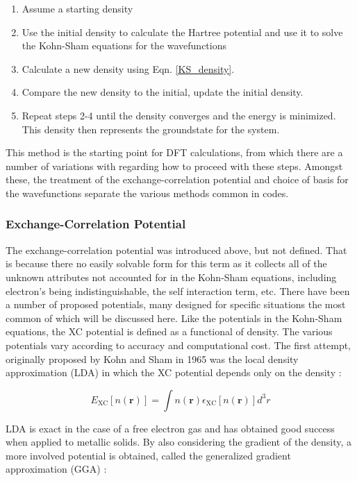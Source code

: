 \begin{enumerate}
	\item Assume a starting density
	\item Use the initial density to calculate the Hartree potential and use it to solve the Kohn-Sham equations for the wavefunctions
	\item Calculate a new density using Eqn. \ref{KS_density}.
	\item Compare the new density to the initial, update the initial density. 
	\item Repeat steps 2-4 until the density converges and the energy is minimized. This density then represents the groundstate for the system.
\end{enumerate}

This method is the starting point for DFT calculations, from which there are a number of  variations with regarding how to proceed with these steps.  Amongst these, the treatment of the exchange-correlation potential and choice of basis for the wavefunctions separate the various methods common in codes.  


\subsubsection{Exchange-Correlation Potential}
The exchange-correlation potential was introduced above, but not defined.  That is because there no easily solvable form for this term as it collects all of the unknown attributes not accounted for in the Kohn-Sham equations, including electron's being indistinguishable, the self interaction term, etc.   There have been a number of proposed potentials, many designed for specific situations the most common of which will be discussed here.  Like the potentials in the Kohn-Sham equations, the XC potential is defined as a functional of density.  The various potentials vary according to accuracy and computational cost.  The first attempt, originally proposed by Kohn and Sham in 1965 was the local density approximation (LDA) in which the XC potential depends only on the density \cite{tao_climbing_2003, ks_1965}: 

\begin{equation}
	E_{\mathrm{XC}}[n(\textbf{r})] = \int  n(\textbf{r}) \epsilon_{\mathrm{XC}}[n(\textbf{r})] d^3r
\end{equation}

LDA is exact in the case of a free electron gas and has obtained good success when applied to metallic solids.  By also considering the gradient of the density, a more involved potential is obtained, called the generalized gradient approximation (GGA) \cite{tao_climbing_2003,perdew_wang} : 



